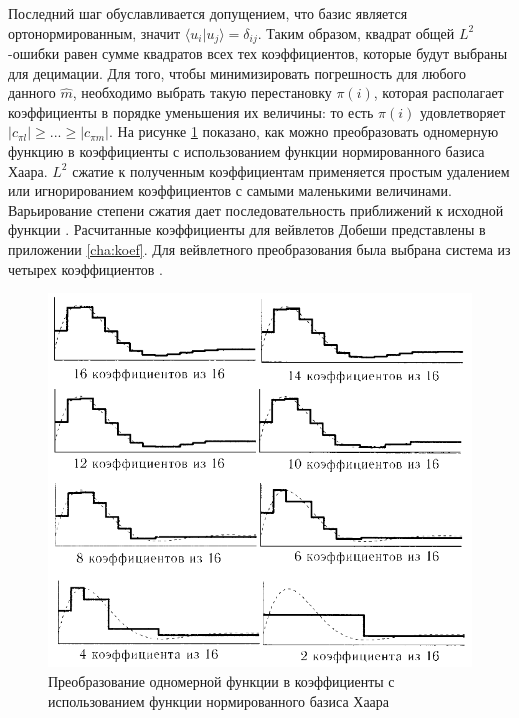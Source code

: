 Последний шаг обуславливается допущением, что базис является ортонормированным, значит 
$\langle u_{i}|u_{j} \rangle = \delta_{ij}$. Таким образом, квадрат общей $L^{2}$-ошибки равен сумме квадратов
всех тех коэффициентов, которые будут выбраны для децимации. Для того, чтобы минимизировать погрешность для
любого данного $\hat{m}$, необходимо выбрать такую перестановку $\pi(i)$, которая располагает коэффициенты в 
порядке уменьшения их величины: то есть $\pi(i)$ удовлетворяет $|c_{\pi l}| \ge ... \ge |c_{\pi m}|$.
На рисунке \ref{fig:dec} показано, как можно преобразовать одномерную функцию в коэффициенты с использованием функции
нормированного базиса Хаара. $L^{2}$ сжатие к полученным коэффициентам применяется простым удалением или игнорированием
коэффициентов с самыми маленькими величинами. Варьирование степени сжатия дает последовательность приближений к исходной функции \cite{Pup10}.
Расчитанные коэффициенты для вейвлетов Добеши представлены в приложении \ref{cha:koef}. Для вейвлетного преобразования была выбрана система 
из четырех коэффициентов \cite{Pup12}.

\begin{figure}[ht]
  \centering
  \includegraphics[scale=0.4]{inc/graphics/dec.png}
  \caption{Преобразование одномерной функции в коэффициенты с использованием функции нормированного базиса Хаара}
  \label{fig:dec}
\end{figure}

